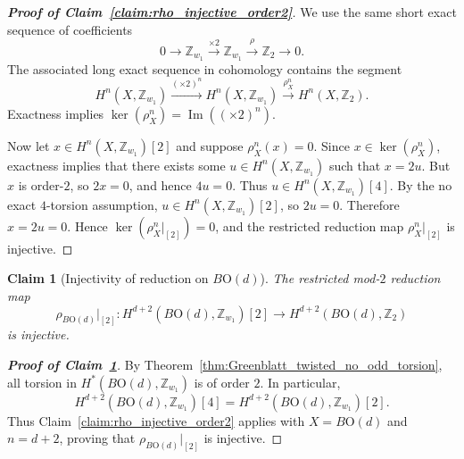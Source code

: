 \documentclass[aps,prx,reprint,superscriptaddress,twocolumn,amsmath,amssymb,amsfonts, nofootinbib]{revtex4-2}
\newcommand{\Z}{\mathbb{Z}}
\theoremstyle{apsstyle}
\newtheorem{claim}{Claim}
\begin{document}
\begin{proof}[\textnormal{\textbf{Proof of Claim~\ref{claim:rho_injective_order2}}}]
We use the same short exact sequence of coefficients
\begin{equation}
0\to \Z_{w_1}\xrightarrow{\times 2}\Z_{w_1}\xrightarrow{\rho}\Z_2\to 0.
\end{equation}
The associated long exact sequence in cohomology contains the segment
\begin{equation}
H^n(X,\Z_{w_1})
\xrightarrow{(\times 2)^{n}}
H^n(X,\Z_{w_1})
\xrightarrow{\rho_{X}^{n}}
H^n(X,\Z_2).
\end{equation}
Exactness implies $\ker(\rho_{X}^{n})=\operatorname{Im}\left((\times 2)^{n}\right)$.

\bigskip 

\noindent Now let $x\in H^n(X,\Z_{w_1})[2]$ and suppose $\rho_{X}^{n}(x)=0$. Since $x\in \ker(\rho_{X}^{n})$, exactness implies that there exists some $u\in H^n(X,\Z_{w_1})$ such that $x=2u$. But $x$ is order-$2$, so $2x=0$, and hence $4u=0$. Thus $u\in H^n(X,\Z_{w_1})[4]$. By the no exact $4$-torsion assumption, $u\in H^n(X,\Z_{w_1})[2]$, so $2u=0$. Therefore $x=2u=0$. Hence $\ker(\rho_{X}^{n}\vert_{[2]})=0$, and the restricted reduction map $\rho_{X}^{n}\vert_{[2]}$ is injective.
\end{proof}

\medskip 

\begin{claim}[Injectivity of reduction on $B\mathrm{O}(d)$]
\label{claim:rho_BO_injective}
The restricted mod-$2$ reduction map
\begin{equation}
\rho_{B\mathrm{O}(d)}\vert_{[2]}:
H^{d+2}(B\mathrm{O}(d),\Z_{w_1})[2]
\longrightarrow
H^{d+2}(B\mathrm{O}(d),\Z_2)
\end{equation}
is injective.
\end{claim}

\begin{proof}[\textnormal{\textbf{Proof of Claim~\ref{claim:rho_BO_injective}}}]
By Theorem~\ref{thm:Greenblatt_twisted_no_odd_torsion}, all torsion in
$H^*(B\mathrm{O}(d),\Z_{w_1})$ is of order $2$. In particular,
\begin{equation}
H^{d+2}(B\mathrm{O}(d),\Z_{w_1})[4]
=
H^{d+2}(B\mathrm{O}(d),\Z_{w_1})[2].
\end{equation}
Thus Claim~\ref{claim:rho_injective_order2} applies with $X=B\mathrm{O}(d)$ and $n=d+2$, proving that $\rho_{B\mathrm{O}(d)}\vert_{[2]}$ is injective.
\end{proof}
\end{document}

